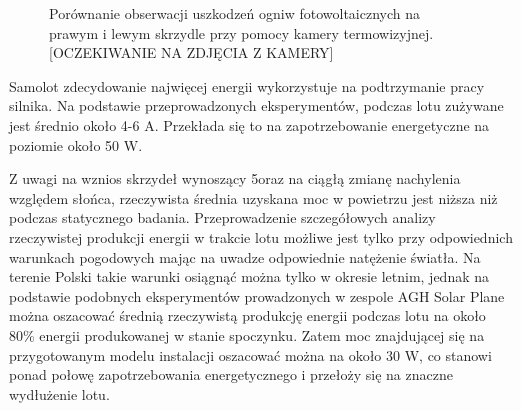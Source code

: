 \documentclass[12pt, a4paper]{article}
\begin{document}
\begin{figure}[ht]
    \centering
    \qquad
    \caption{Porównanie obserwacji uszkodzeń ogniw fotowoltaicznych na prawym i lewym skrzydle przy pomocy kamery termowizyjnej. [OCZEKIWANIE NA ZDJĘCIA Z KAMERY]}
    \label{fig:uszkodzenia}
\end{figure}

Samolot zdecydowanie najwięcej energii wykorzystuje na podtrzymanie pracy silnika. Na podstawie przeprowadzonych eksperymentów, podczas lotu zużywane jest średnio około 4-6 A. Przekłada się to na zapotrzebowanie energetyczne na poziomie około 50 W. 

Z uwagi na wznios skrzydeł wynoszący 5\textdegree oraz na ciągłą zmianę nachylenia względem słońca, rzeczywista średnia uzyskana moc w powietrzu jest niższa niż podczas statycznego badania. Przeprowadzenie szczegółowych analizy rzeczywistej produkcji energii w trakcie lotu możliwe jest tylko przy odpowiednich warunkach pogodowych mając na uwadze odpowiednie natężenie światła. Na terenie Polski takie warunki osiągnąć można tylko w okresie letnim, jednak na podstawie podobnych eksperymentów prowadzonych w zespole AGH Solar Plane można oszacować średnią rzeczywistą produkcję energii podczas lotu na około 80\% energii produkowanej w stanie spoczynku. Zatem moc znajdującej się na przygotowanym modelu instalacji oszacować można na około 30 W, co stanowi ponad połowę zapotrzebowania energetycznego i przełoży się na znaczne wydłużenie lotu.
\end{document}
